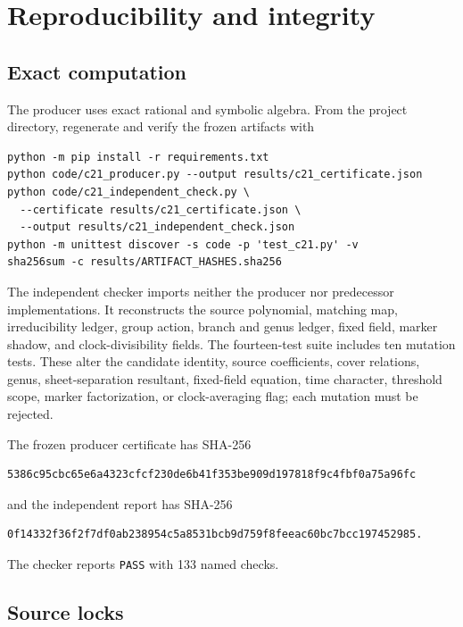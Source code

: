 \section{Reproducibility and integrity}\label{app:reproducibility}

\subsection{Exact computation}

The producer uses exact rational and symbolic algebra.  From the project
directory, regenerate and verify the frozen artifacts with
\begin{verbatim}
python -m pip install -r requirements.txt
python code/c21_producer.py --output results/c21_certificate.json
python code/c21_independent_check.py \
  --certificate results/c21_certificate.json \
  --output results/c21_independent_check.json
python -m unittest discover -s code -p 'test_c21.py' -v
sha256sum -c results/ARTIFACT_HASHES.sha256
\end{verbatim}
The independent checker imports neither the producer nor predecessor
implementations.  It reconstructs the source polynomial, matching map,
irreducibility ledger, group action, branch and genus ledger, fixed field,
marker shadow, and clock-divisibility fields.  The fourteen-test suite
includes ten mutation tests.  These alter the candidate identity, source
coefficients, cover relations, genus, sheet-separation resultant, fixed-field
equation, time character, threshold scope, marker factorization, or
clock-averaging flag; each mutation must be rejected.

The frozen producer certificate has SHA-256
\begin{verbatim}
5386c95cbc65e6a4323cfcf230de6b41f353be909d197818f9c4fbf0a75a96fc
\end{verbatim}
and the independent report has SHA-256
\begin{verbatim}
0f14332f36f2f7df0ab238954c5a8531bcb9d759f8feeac60bc7bcc197452985.
\end{verbatim}
The checker reports \texttt{PASS} with 133 named checks.

\subsection{Source locks}

